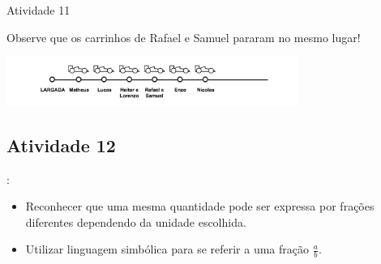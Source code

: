 \begin{multicols}{2}
  \vspace{.1cm}





\begin{resposta*}{Atividade 11}

Observe que os carrinhos de Rafael e Samuel pararam no mesmo lugar!

\hspace{-15mm} \includegraphics[width=95mm, keepaspectratio]{../figuras/licao02/ativ12_resposta.png}

\end{resposta*}

\newpage




\subsection{Atividade 12}


   \vspace{.1cm}:

  \begin{itemize} %
    \item Reconhecer que uma mesma quantidade pode ser expressa por frações diferentes dependendo da unidade escolhida.
    \item Utilizar linguagem simbólica para se referir a uma fração $\frac{a}{b}$.
\end{itemize} %



\end{multicols}

